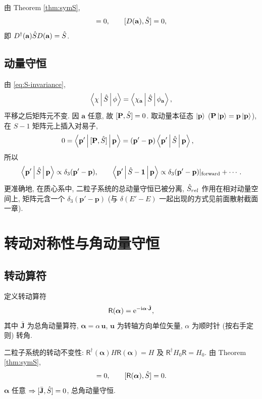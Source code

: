 由 Theorem \ref{thm:symS},
\begin{equation}
[D(\mathbf{a}),\Omega_\pm]=0,\qquad [D(\mathbf{a}),\Smat]=0,
\end{equation}
即 $D^\dagger(\mathbf{a})\hat{S} D(\mathbf{a})=\hat{S}$.

\subsection{动量守恒}

由 \eqref{eq:S-invariance},
\begin{equation}
\left\langle \chi \,\middle|\, \hat{S} \,\middle|\, \phi \right\rangle=\left\langle \chi_{\mathbf{a}} \,\middle|\, \hat{S} \,\middle|\, \phi_{\mathbf{a}} \right\rangle,
\end{equation}
平移之后矩阵元不变. 因 $\mathbf{a}$ 任意, 故 $[\mathbf{P},\hat{S}]=0$. 取动量本征态 $\ket{\mathbf{p}}$ ($\mathbf{P}\ket{\mathbf{p}}=\mathbf{p}\ket{\mathbf{p}}$), 在 $S-1$ 矩阵元上插入对易子,
\begin{align}
0&=\left\langle \mathbf{p}' \,\middle|\, [\mathbf{P},\hat{S}] \,\middle|\, \mathbf{p} \right\rangle=(\mathbf{p}'-\mathbf{p})\left\langle \mathbf{p}' \,\middle|\, \hat{S} \,\middle|\, \mathbf{p} \right\rangle,
\end{align}
所以
\begin{equation}\label{eq:Sdelta}
\left\langle \mathbf{p}' \,\middle|\, \hat{S} \,\middle|\, \mathbf{p} \right\rangle\propto \delta_3(\mathbf{p}'-\mathbf{p}),\qquad \left\langle \mathbf{p}' \,\middle|\, \hat{S}-\mathbf{1} \,\middle|\, \mathbf{p} \right\rangle\propto \delta_3(\mathbf{p}'-\mathbf{p})|_{\text{forward}}+\cdots.
\end{equation}
更准确地, 在质心系中, 二粒子系统的总动量守恒已被分离, $\hat{S}_{rel}$ 作用在相对动量空间上, 矩阵元含一个 $\delta_3(\mathbf{p}'-\mathbf{p})$ (与 $\delta(E'-E)$ 一起出现的方式见前面散射截面一章).


\section{转动对称性与角动量守恒}\label{sec:rotation}

\subsection{转动算符}

定义转动算符
\begin{equation}
\mathsf{R}(\bm{\alpha})=\mathrm{e}^{-\mathrm{i} \bm{\alpha}\cdot \bar{\mathbf{J}}},
\end{equation}
其中 $\bar{\mathbf{J}}$ 为总角动量算符, $\bm{\alpha}=\alpha\,\mathbf{u}$, $\mathbf{u}$ 为转轴方向单位矢量, $\alpha$ 为顺时针 (按右手定则) 转角.

二粒子系统的转动不变性: $\mathsf{R}^\dagger(\bm{\alpha})H\mathsf{R}(\bm{\alpha})=H$ 及 $\mathsf{R}^\dagger H_0 \mathsf{R}=H_0$. 由 Theorem \ref{thm:symS},
\begin{equation}
[\mathsf{R}(\bm{\alpha}),\Omega_\pm]=0,\qquad [\mathsf{R}(\bm{\alpha}),\Smat]=0.
\end{equation}
$\bm{\alpha}$ 任意 $\Rightarrow [\bar{\mathbf{J}},\hat{S}]=0$, 总角动量守恒.

